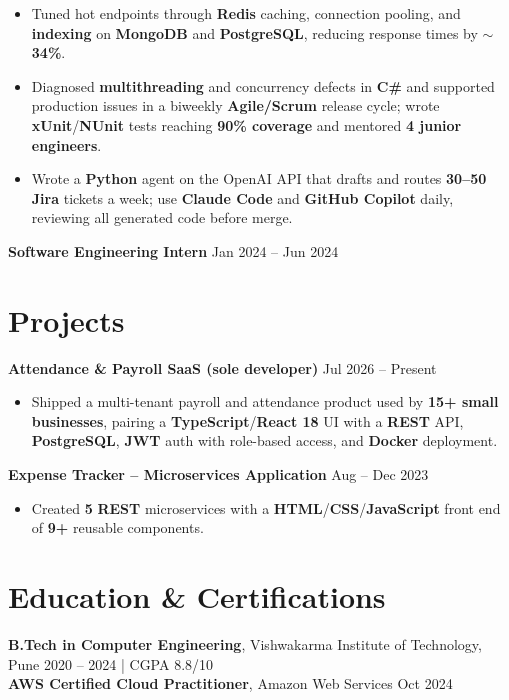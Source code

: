 \documentclass[a4paper,10pt]{article}
\begin{document}
\begin{itemize}[leftmargin=*]
    \item Tuned hot endpoints through \textbf{Redis} caching, connection pooling, and \textbf{indexing} on \textbf{MongoDB} and \textbf{PostgreSQL}, reducing response times by ${\sim}$\textbf{34\%}.
    \item Diagnosed \textbf{multithreading} and concurrency defects in \textbf{C\#} and supported production issues in a biweekly \textbf{Agile/Scrum} release cycle; wrote \textbf{xUnit}/\textbf{NUnit} tests reaching \textbf{90\% coverage} and mentored \textbf{4 junior engineers}.
    \item Wrote a \textbf{Python} agent on the OpenAI API that drafts and routes \textbf{30--50 Jira} tickets a week; use \textbf{Claude Code} and \textbf{GitHub Copilot} daily, reviewing all generated code before merge.
\end{itemize}

\textbf{Software Engineering Intern} \hfill Jan 2024 -- Jun 2024

\section*{Projects}

\textbf{Attendance \& Payroll SaaS (sole developer)} \hfill Jul 2026 -- Present
\begin{itemize}[leftmargin=*]
    \item Shipped a multi-tenant payroll and attendance product used by \textbf{15+ small businesses}, pairing a \textbf{TypeScript}/\textbf{React 18} UI with a \textbf{REST} API, \textbf{PostgreSQL}, \textbf{JWT} auth with role-based access, and \textbf{Docker} deployment.
\end{itemize}

\noindent\textbf{Expense Tracker -- Microservices Application} \hfill Aug -- Dec 2023
\begin{itemize}[leftmargin=*]
    \item Created \textbf{5} \textbf{REST} microservices with a \textbf{HTML}/\textbf{CSS}/\textbf{JavaScript} front end of \textbf{9+} reusable components.
\end{itemize}

\section*{Education \& Certifications}
\textbf{B.Tech in Computer Engineering}, Vishwakarma Institute of Technology, Pune \hfill 2020 -- 2024 \;|\; CGPA 8.8/10 \\
\textbf{AWS Certified Cloud Practitioner}, Amazon Web Services \hfill Oct 2024
\end{document}
